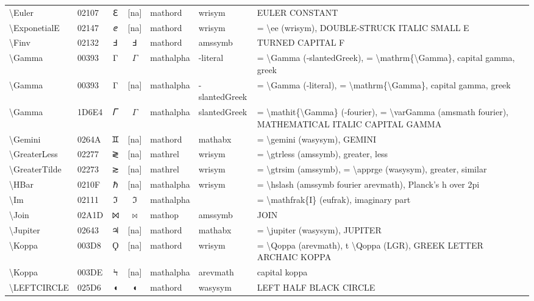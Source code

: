 \documentclass[a4paper,landscape]{article}
\begin{document}
\begin{longtable}{llcclll}
\textbackslash{}Euler & 02107 & ℇ & [na] & mathord & wrisym & EULER CONSTANT \\
\textbackslash{}ExponetialE & 02147 & ⅇ & [na] & mathord & wrisym & = \textbackslash{}ee (wrisym), DOUBLE-STRUCK ITALIC SMALL E \\
\textbackslash{}Finv & 02132 & Ⅎ & $\Finv$ & mathord & amssymb & TURNED CAPITAL F \\
\textbackslash{}Gamma & 00393 & Γ & $\Gamma$ & mathalpha & -literal & = \textbackslash{}Gamma (-slantedGreek), = \textbackslash{}mathrm\{\textbackslash{}Gamma\}, capital gamma, greek \\
\textbackslash{}Gamma & 00393 & Γ & [na] & mathalpha & -slantedGreek & = \textbackslash{}Gamma (-literal),  = \textbackslash{}mathrm\{\textbackslash{}Gamma\},  capital gamma,  greek \\
\textbackslash{}Gamma & 1D6E4 & 𝛤 & $\Gamma$ & mathalpha & slantedGreek & = \textbackslash{}mathit\{\textbackslash{}Gamma\} (-fourier), = \textbackslash{}varGamma (amsmath fourier), MATHEMATICAL ITALIC CAPITAL GAMMA \\
\textbackslash{}Gemini & 0264A & \textsf ♊ & [na] & mathord & mathabx & = \textbackslash{}gemini (wasysym),  GEMINI \\
\textbackslash{}GreaterLess & 02277 & ≷ & [na] & mathrel & wrisym & = \textbackslash{}gtrless (amssymb),  greater,  less \\
\textbackslash{}GreaterTilde & 02273 & ≳ & [na] & mathrel & wrisym & = \textbackslash{}gtrsim (amssymb), = \textbackslash{}apprge (wasysym),  greater,  similar \\
\textbackslash{}HBar & 0210F & ℏ & [na] & mathalpha & wrisym & = \textbackslash{}hslash (amssymb fourier arevmath),  Planck's h over 2pi \\
\textbackslash{}Im & 02111 & ℑ & $\Im$ & mathalpha &  & = \textbackslash{}mathfrak\{I\} (eufrak), imaginary part \\
\textbackslash{}Join & 02A1D & ⨝ & $\Join$ & mathop & amssymb & JOIN \\
\textbackslash{}Jupiter & 02643 & \textsf ♃ & [na] & mathord & mathabx & = \textbackslash{}jupiter (wasysym),  JUPITER \\
\textbackslash{}Koppa & 003D8 & Ϙ & [na] & mathord & wrisym & = \textbackslash{}Qoppa (arevmath),  t \textbackslash{}Qoppa (LGR),  GREEK LETTER ARCHAIC KOPPA \\
\textbackslash{}Koppa & 003DE & Ϟ & [na] & mathalpha & arevmath & capital koppa \\
\textbackslash{}LEFTCIRCLE & 025D6 & ◖ & $\LEFTCIRCLE$ & mathord & wasysym & LEFT HALF BLACK CIRCLE \\

\end{longtable}
\end{document}

